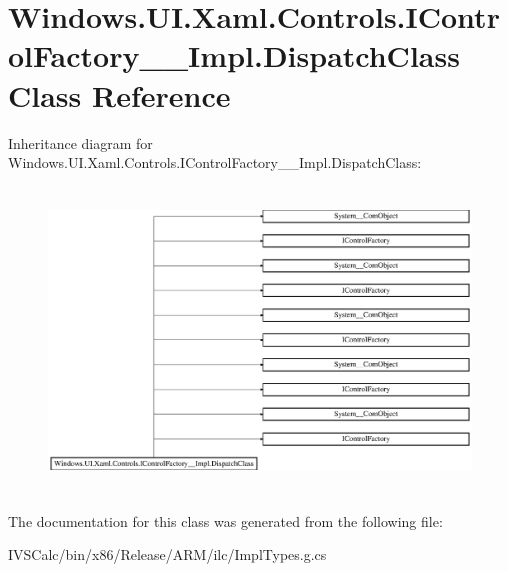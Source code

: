 \hypertarget{class_windows_1_1_u_i_1_1_xaml_1_1_controls_1_1_i_control_factory_____impl_1_1_dispatch_class}{}\section{Windows.\+U\+I.\+Xaml.\+Controls.\+I\+Control\+Factory\+\_\+\+\_\+\+Impl.\+Dispatch\+Class Class Reference}
\label{class_windows_1_1_u_i_1_1_xaml_1_1_controls_1_1_i_control_factory_____impl_1_1_dispatch_class}
Inheritance diagram for Windows.\+U\+I.\+Xaml.\+Controls.\+I\+Control\+Factory\+\_\+\+\_\+\+Impl.\+Dispatch\+Class\+:\begin{figure}[H]
\begin{center}
\leavevmode
\includegraphics[height=8.105263cm]{class_windows_1_1_u_i_1_1_xaml_1_1_controls_1_1_i_control_factory_____impl_1_1_dispatch_class}
\end{center}
\end{figure}


The documentation for this class was generated from the following file\+:\begin{DoxyCompactItemize}
\item 
I\+V\+S\+Calc/bin/x86/\+Release/\+A\+R\+M/ilc/Impl\+Types.\+g.\+cs\end{DoxyCompactItemize}
